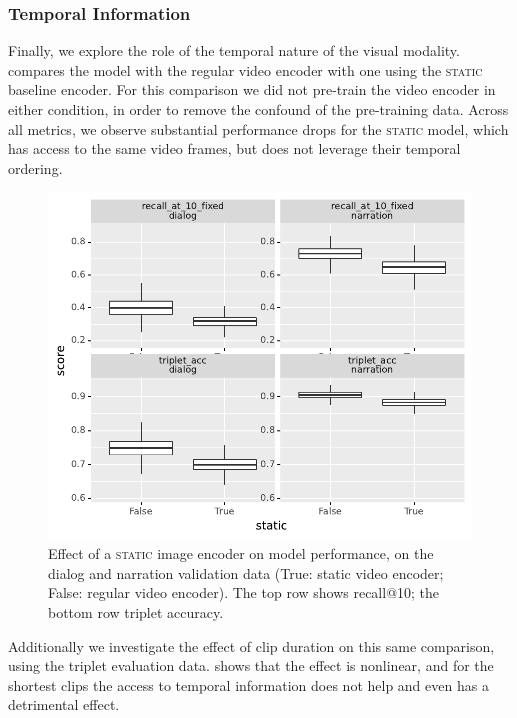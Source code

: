 \subsubsection{Temporal Information}
Finally, we explore the role of the temporal nature of the visual
modality.   compares the model with the regular video
encoder with one using the \textsc{static} baseline encoder.  For this
comparison we did not pre-train the video encoder in either condition,
in order to remove the confound of the pre-training data.  Across all
metrics, we observe substantial performance drops for the
\textsc{static} model, which has access to the same video frames, but
does not leverage their temporal ordering.
\begin{figure}[htb]
  \centering
  \includegraphics[width=\columnwidth]{results/ablations/static.pdf}
  \caption{Effect of a \textsc{static} image encoder on model
    performance, on the dialog and narration validation data (True:
    static video encoder; False: regular video encoder). The top row
    shows recall@10; the bottom row triplet accuracy.}
  \label{fig:static}
\end{figure}
Additionally we investigate the effect of clip duration on this same
comparison, using the triplet evaluation
data.  shows that the effect is nonlinear,
and for the shortest clips the access to temporal information does not
help and even has a detrimental effect.

